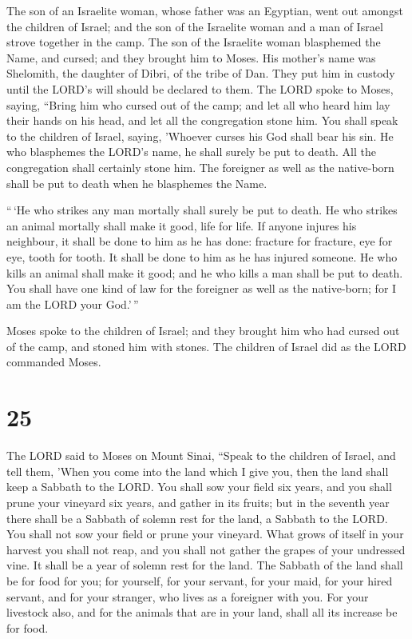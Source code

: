  The son of an Israelite woman, whose father was an
Egyptian, went out amongst the children of Israel; and the son of the
Israelite woman and a man of Israel strove together in the camp.
 The son of the Israelite woman blasphemed the Name, and
cursed; and they brought him to Moses. His mother's name was Shelomith,
the daughter of Dibri, of the tribe of Dan.  They put him
in custody until the LORD's will should be declared to them.
 The LORD spoke to Moses, saying,  ``Bring him
who cursed out of the camp; and let all who heard him lay their hands on
his head, and let all the congregation stone him.  You
shall speak to the children of Israel, saying, 'Whoever curses his God
shall bear his sin.  He who blasphemes the LORD's name, he
shall surely be put to death. All the congregation shall certainly stone
him. The foreigner as well as the native-born shall be put to death when
he blasphemes the Name.

 ``\,`He who strikes any man mortally shall surely be put
to death.  He who strikes an animal mortally shall make it
good, life for life.  If anyone injures his neighbour, it
shall be done to him as he has done:  fracture for
fracture, eye for eye, tooth for tooth. It shall be done to him as he
has injured someone.  He who kills an animal shall make it
good; and he who kills a man shall be put to death.  You
shall have one kind of law for the foreigner as well as the native-born;
for I am the LORD your God.'\,''

 Moses spoke to the children of Israel; and they brought
him who had cursed out of the camp, and stoned him with stones. The
children of Israel did as the LORD commanded Moses.

\hypertarget{section-24}{%
\section{25}\label{section-24}}

 The LORD said to Moses on Mount Sinai,  ``Speak
to the children of Israel, and tell them, 'When you come into the land
which I give you, then the land shall keep a Sabbath to the LORD.
 You shall sow your field six years, and you shall prune
your vineyard six years, and gather in its fruits;  but in
the seventh year there shall be a Sabbath of solemn rest for the land, a
Sabbath to the LORD. You shall not sow your field or prune your
vineyard.  What grows of itself in your harvest you shall
not reap, and you shall not gather the grapes of your undressed vine. It
shall be a year of solemn rest for the land.  The Sabbath of
the land shall be for food for you; for yourself, for your servant, for
your maid, for your hired servant, and for your stranger, who lives as a
foreigner with you.  For your livestock also, and for the
animals that are in your land, shall all its increase be for food.

